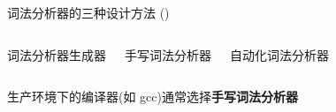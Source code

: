 \begin{frame}{}
  \begin{center}
    {\large 词法分析器的三种设计方法 ()}
  \end{center}

  \vspace{0.30cm}
  \begin{columns}
      \begin{center}
        词法分析器生成器
      \end{center}
      \begin{center}
        手写词法分析器
      \end{center}
      \begin{center}
        自动化词法分析器
      \end{center}
  \end{columns}

  \vspace{0.50cm}
  \begin{center}
    生产环境下的编译器(如 gcc)通常选择{\bf 手写词法分析器}
  \end{center}
\end{frame}

\begin{frame}{}

  \begin{columns}
  \end{columns}
\end{frame}
